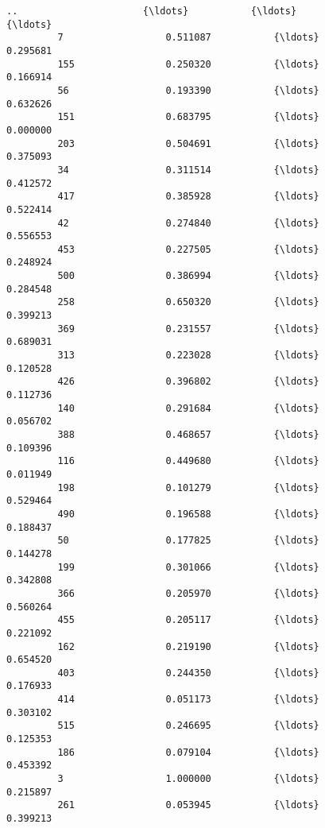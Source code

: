\documentclass[11pt]{article}
\begin{document}
\begin{Verbatim}[commandchars=\\\{\}]
         ..                      {\ldots}           {\ldots}                      {\ldots}   
         7                  0.511087           {\ldots}                 0.295681   
         155                0.250320           {\ldots}                 0.166914   
         56                 0.193390           {\ldots}                 0.632626   
         151                0.683795           {\ldots}                 0.000000   
         203                0.504691           {\ldots}                 0.375093   
         34                 0.311514           {\ldots}                 0.412572   
         417                0.385928           {\ldots}                 0.522414   
         42                 0.274840           {\ldots}                 0.556553   
         453                0.227505           {\ldots}                 0.248924   
         500                0.386994           {\ldots}                 0.284548   
         258                0.650320           {\ldots}                 0.399213   
         369                0.231557           {\ldots}                 0.689031   
         313                0.223028           {\ldots}                 0.120528   
         426                0.396802           {\ldots}                 0.112736   
         140                0.291684           {\ldots}                 0.056702   
         388                0.468657           {\ldots}                 0.109396   
         116                0.449680           {\ldots}                 0.011949   
         198                0.101279           {\ldots}                 0.529464   
         490                0.196588           {\ldots}                 0.188437   
         50                 0.177825           {\ldots}                 0.144278   
         199                0.301066           {\ldots}                 0.342808   
         366                0.205970           {\ldots}                 0.560264   
         455                0.205117           {\ldots}                 0.221092   
         162                0.219190           {\ldots}                 0.654520   
         403                0.244350           {\ldots}                 0.176933   
         414                0.051173           {\ldots}                 0.303102   
         515                0.246695           {\ldots}                 0.125353   
         186                0.079104           {\ldots}                 0.453392   
         3                  1.000000           {\ldots}                 0.215897   
         261                0.053945           {\ldots}                 0.399213   
         

\end{Verbatim}
\end{document}
